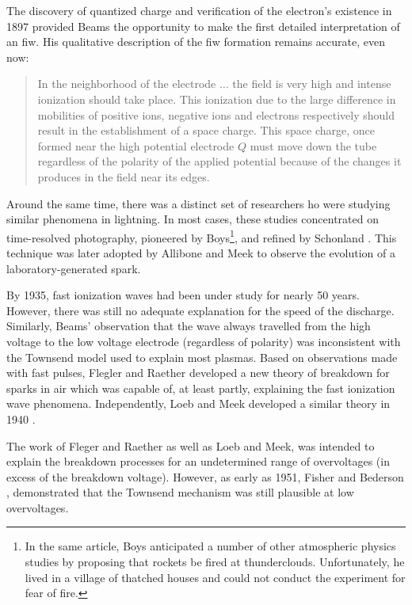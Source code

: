 The discovery of quantized charge and verification of the electron's existence
in 1897 \cite{Thomson1897} provided Beams the opportunity to make the first
detailed interpretation of an \acs{fiw}. His qualitative description of the
\acs{fiw} formation remains accurate, even now:

\begin{quote}
  In the neighborhood of the electrode $\ldots{}$ the field is very high and
  intense ionization should take place. This ionization due to the large
  difference in mobilities of positive ions, negative ions and electrons
  respectively should result in the establishment of a space charge. This space
  charge, once formed near the high potential electrode $Q$ must move down the
  tube regardless of the polarity of the applied potential because of the
  changes it produces in the field near its edges.
\end{quote}

Around the same time, there was a distinct set of researchers ho were studying
similar phenomena in lightning. In most cases, these studies concentrated on
time-resolved photography, pioneered by Boys\footnote{In the same article, Boys
anticipated a number of other atmospheric physics studies by proposing that
rockets be fired at thunderclouds. Unfortunately, he lived in a village of
thatched houses and could not conduct the experiment for fear of
fire.}\cite{Boys1926}, and refined by Schonland \cite{Schonland1935}. This
technique was later adopted by Allibone and Meek \cite{Allibone1938} to observe
the evolution of a laboratory-generated spark.

By 1935, fast ionization waves had been under study for nearly 50 years.
However, there was still no adequate explanation for the speed of the discharge.
Similarly, Beams' observation that the wave always travelled from the high
voltage to the low voltage electrode (regardless of polarity) was inconsistent
with the Townsend model used to explain most plasmas. Based on observations made
with fast pulses, Flegler and Raether developed a new theory of breakdown for
sparks in air \cite{Flegler1936} which was capable of, at least partly,
explaining the fast ionization wave phenomena. Independently, Loeb and Meek
developed a similar theory in 1940 \cite{Loeb1940}.

The work of Fleger and Raether as well as Loeb and Meek, was intended to explain
the breakdown processes for an undetermined range of overvoltages (in excess of
the breakdown voltage). However, as early as 1951, Fisher and Bederson
\cite{Fisher1951}, demonstrated that the Townsend mechanism was still plausible
at low overvoltages.

